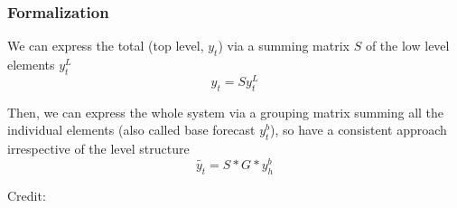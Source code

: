 \documentclass{beamer}
\newenvironment{wideitemize}{\itemize\addtolength{\itemsep}{10pt}}{\enditemize}
\begin{document}
 \begin{frame}
 \frametitle{Formalization}

 \begin{wideitemize}
 \item We can express the total (top level, $y_t$) via a summing matrix $S$ of the low level elements $y^L_t$
   \begin{equation*}
     y_t = S y^L_t
   \end{equation*}
 \item Then, we can express the whole system via a grouping matrix summing all the individual elements (also called base forecast $y^b_t$), so have a consistent approach irrespective of the level structure
   \begin{equation*}
     \tilde{y_t} = S*G*y^b_{h}
   \end{equation*}
 \end{wideitemize}

 \hspace*{15pt}\hbox{\scriptsize Credit:}      
 
 \end{frame}
\end{document}
